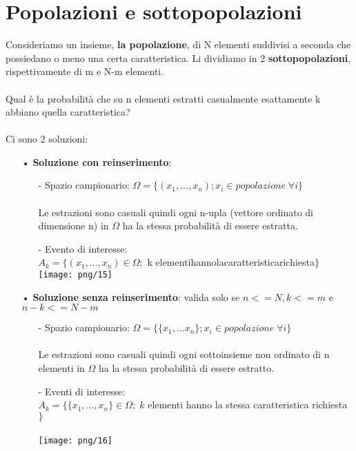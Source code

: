 \documentclass[12pt, letterpaper]{article}
\begin{document}
\section{Popolazioni e sottopopolazioni}

Consideriamo un insieme, \textbf{la popolazione}, di N elementi suddivisi a seconda che possiedano o meno una certa caratteristica.
Li dividiamo in 2 \textbf{sottopopolazioni}, rispettivamente di m e N-m elementi.
\\
\\Qual è la probabilità che su n elementi estratti casualmente esattamente k abbiano quella caratteristica?
\\
\\Ci sono 2 soluzioni:
\begin{itemize}
   \item[•] \textbf{Soluzione con reinserimento}:
      \begin{itemize}
         \item[-] Spazio campionario: $\Omega = \{(x_1, ... , x_n); x_i \in popolazione\; \forall i\}$
            \\
            \\Le estrazioni sono casuali quindi ogni n-upla (vettore ordinato di dimensione n) in $\Omega$ ha la stessa probabilità di essere estratta.
         \item[-] Evento di interesse:
            \\$A_k = \{(x_1, ... , x_n) \in \Omega;$ k\; elementi\;hanno\;la\;caratteristica\;richiesta$\}$
            \\
            \texttt{[image: png/15]}
            \\
      \end{itemize}
   \item[•] \textbf{Soluzione senza reinserimento}: valida solo se $n <= N, k <= m$ e $n-k <= N-m$
      \begin{itemize}
         \item[-] Spazio campionario: $\Omega = \{\{x_1,...x_n\} ; x_i \in popolazione\; \forall i\}$
            \\
            \\Le estrazioni sono casuali quindi ogni sottoinsieme non ordinato di n elementi in $\Omega$ ha la stessa probabilità 
              di essere estratto.
            \item[-] Eventi di interesse: 
            \\$A_k = \{\{x_1, ..., x_n\}\in \Omega ;\;k$ elementi hanno la stessa caratteristica richiesta $\}$\\
            \\\texttt{[image: png/16]}
            \\
      \end{itemize}
\end{itemize}
\end{document}
